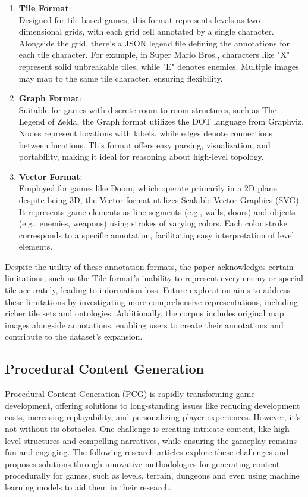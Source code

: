 \documentclass[runningheads]{llncs}
\begin{document}
\begin{enumerate}

\item \textbf{Tile Format}:\\
Designed for tile-based games, this format represents levels as two-dimensional grids, with each grid cell annotated by a single character. Alongside the grid, there's a JSON legend file defining the annotations for each tile character. For example, in Super Mario Bros., characters like "X" represent solid unbreakable tiles, while "E" denotes enemies. Multiple images may map to the same tile character, ensuring flexibility.

\item \textbf{Graph Format}:\\
Suitable for games with discrete room-to-room structures, such as The Legend of Zelda, the Graph format utilizes the DOT language from Graphviz. Nodes represent locations with labels, while edges denote connections between locations. This format offers easy parsing, visualization, and portability, making it ideal for reasoning about high-level topology.

\item \textbf{Vector Format}:\\
Employed for games like Doom, which operate primarily in a 2D plane despite being 3D, the Vector format utilizes Scalable Vector Graphics (SVG). It represents game elements as line segments (e.g., walls, doors) and objects (e.g., enemies, weapons) using strokes of varying colors. Each color stroke corresponds to a specific annotation, facilitating easy interpretation of level elements.

\end{enumerate}

Despite the utility of these annotation formats, the paper acknowledges certain limitations, such as the Tile format's inability to represent every enemy or special tile accurately, leading to information loss. Future exploration aims to address these limitations by investigating more comprehensive representations, including richer tile sets and ontologies. Additionally, the corpus includes original map images alongside annotations, enabling users to create their annotations and contribute to the dataset's expansion.


\subsection{Procedural Content Generation}
Procedural Content Generation (PCG) is rapidly transforming game development, offering solutions to long-standing issues like reducing development costs, increasing replayability, and personalizing player experiences. However, it's not without its obstacles. One challenge is creating intricate content, like high-level structures and compelling narratives, while ensuring the gameplay remains fun and engaging. The following research articles explore these challenges and proposes solutions through innovative methodologies for generating content procedurally for games, such as levels, terrain, dungeons and even using machine learning models to aid them in their research.
\end{document}
